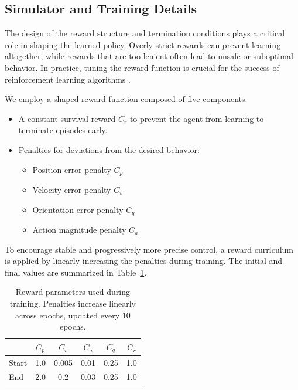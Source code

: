 \subsection{Simulator and Training Details} \label{sup:sim}

The design of the reward structure and termination conditions plays a critical role in shaping the learned policy. Overly strict rewards can prevent learning altogether, while rewards that are too lenient often lead to unsafe or suboptimal behavior. In practice, tuning the reward function is crucial for the success of reinforcement learning algorithms \cite{Silver2021}.

We employ a shaped reward function composed of five components:

\begin{itemize}
    \item A constant survival reward \( C_r \) to prevent the agent from learning to terminate episodes early.
    \item Penalties for deviations from the desired behavior:
        \begin{itemize}
            \item Position error penalty \( C_p \)
            \item Velocity error penalty \( C_v \)
            \item Orientation error penalty \( C_q \)
            \item Action magnitude penalty \( C_a \)
        \end{itemize}
\end{itemize}

To encourage stable and progressively more precise control, a reward curriculum is applied by linearly increasing the penalties during training. The initial and final values are summarized in Table~\ref{tab:learning_types}.

\begin{table}[h]
    \centering
    \begin{tabular}{lccccc}
        \toprule
        & \( C_p \) & \( C_v \) & \( C_a \) & \( C_q \) & \( C_r \) \\
        \midrule
        Start & 1.0 & 0.005 & 0.01 & 0.25 & 1.0 \\
        End   & 2.0 & 0.2   & 0.03 & 0.25 & 1.0 \\
        \bottomrule
    \end{tabular}
    \caption{Reward parameters used during training. Penalties increase linearly across epochs, updated every 10 epochs.}
    \label{tab:learning_types}
\end{table}

